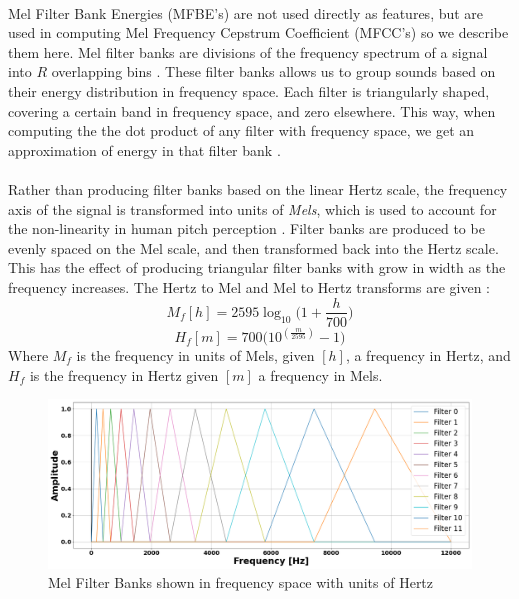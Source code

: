 \documentclass[12pt,letterpaper]{article}
\begin{document}
\paragraph*{}Mel Filter Bank Energies (MFBE's) are not used directly as features, but are used in computing Mel Frequency Cepstrum Coefficient (MFCC's) so we describe them here. Mel filter banks are divisions of the frequency spectrum of a signal into $R$ overlapping bins \cite{Sahidullah,Serizel}. These filter banks allows us to group sounds based on their energy distribution in frequency space. Each filter is triangularly shaped, covering a certain band in frequency space, and zero elsewhere. This way, when computing the the dot product of any filter with frequency space, we get an approximation of energy in that filter bank \cite{Sahidullah,Serizel}. 

\paragraph*{}Rather than producing filter banks based on the linear Hertz scale, the frequency axis of the signal is transformed into units of \textit{Mels}, which is used to account for the non-linearity in human pitch perception \cite{Serizel,Khan,Olson}. Filter banks are produced to be evenly spaced on the Mel scale, and then transformed back into the Hertz scale. This has the effect of producing triangular filter banks with grow in width as the frequency increases. The Hertz to Mel and Mel to Hertz transforms are given \cite{Serizel,Khan}:
\begin{equation}
\label{eqn-HztoMel}
M_f[h] = 2595 \log_{10}\big(1+ \frac{h}{700}\big)
\end{equation}
\begin{equation}
\label{eqn-MeltoHz}
H_f[m] = 700 \big(10^{(\frac{m}{2595})}-1\big)
\end{equation}
Where $M_f$ is the frequency in units of Mels, given $[h]$, a frequency in Hertz, and $H_f$ is the frequency in Hertz given $[m]$ a frequency in Mels.


\begin{figure}[H]
\begin{center}
\includegraphics[scale=0.28]{../FiguresSpectrogram/MelFilterBanks}
\end{center}
\caption{Mel Filter Banks shown in frequency space with units of Hertz}
\label{fig-MelFilterBanks}
\end{figure}
\end{document}
